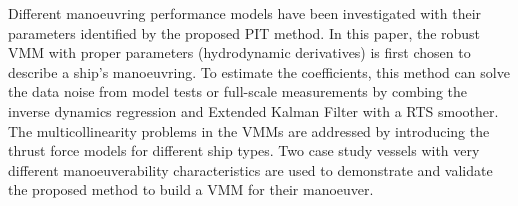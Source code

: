 Different manoeuvring performance models have been investigated with their parameters identified by the proposed PIT method. In this paper, the robust VMM with proper parameters (hydrodynamic derivatives) is first chosen to describe a ship’s manoeuvring. To estimate the coefficients, this method can solve the data noise from model tests or full-scale measurements by combing the inverse dynamics regression and Extended Kalman Filter with a RTS smoother. The multicollinearity problems in the VMMs are addressed by introducing the thrust force models for different ship types. Two case study vessels with very different manoeuverability characteristics are used to demonstrate and validate the proposed method to build a VMM for their manoeuver.